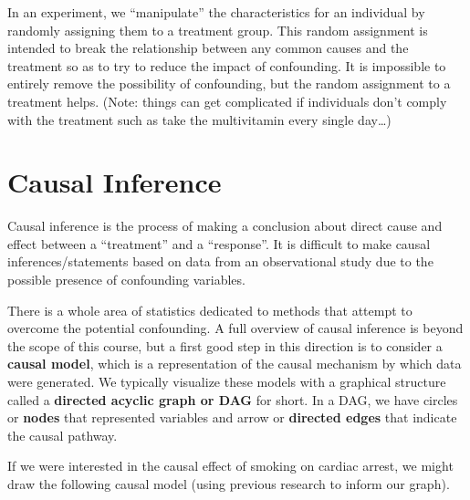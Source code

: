 \documentclass[]{book}
\begin{document}
In an experiment, we ``manipulate'' the characteristics for an individual by randomly assigning them to a treatment group. This random assignment is intended to break the relationship between any common causes and the treatment so as to try to reduce the impact of confounding. It is impossible to entirely remove the possibility of confounding, but the random assignment to a treatment helps. (Note: things can get complicated if individuals don't comply with the treatment such as take the multivitamin every single day\ldots{})

\hypertarget{dag}{%
\section{Causal Inference}\label{dag}}

Causal inference is the process of making a conclusion about direct cause and effect between a ``treatment'' and a ``response''. It is difficult to make causal inferences/statements based on data from an observational study due to the possible presence of confounding variables.

There is a whole area of statistics dedicated to methods that attempt to overcome the potential confounding. A full overview of causal inference is beyond the scope of this course, but a first good step in this direction is to consider a \textbf{causal model}, which is a representation of the causal mechanism by which data were generated. We typically visualize these models with a graphical structure called a \textbf{directed acyclic graph or DAG} for short. In a DAG, we have circles or \textbf{nodes} that represented variables and arrow or \textbf{directed edges} that indicate the causal pathway.

If we were interested in the causal effect of smoking on cardiac arrest, we might draw the following causal model (using previous research to inform our graph).
\end{document}
